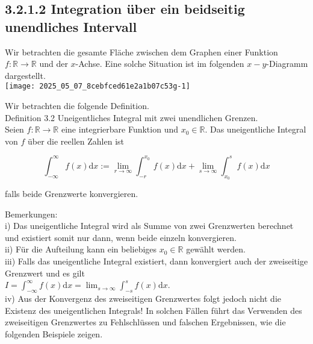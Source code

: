 \documentclass[10pt]{article}
\begin{document}
\subsection*{3.2.1.2 Integration über ein beidseitig unendliches Intervall}
Wir betrachten die gesamte Fläche zwischen dem Graphen einer Funktion $f: \mathbb{R} \rightarrow \mathbb{R}$ und der $x$-Achse. Eine solche Situation ist im folgenden $x-y$-Diagramm dargestellt.\\
\texttt{[image: 2025\_05\_07\_8cebfced61e2a1b07c53g-1]}

Wir betrachten die folgende Definition.\\
Definition 3.2 Uneigentliches Integral mit zwei unendlichen Grenzen.\\
Seien $f: \mathbb{R} \rightarrow \mathbb{R}$ eine integrierbare Funktion und $x_{0} \in \mathbb{R}$. Das uneigentliche Integral von $f$ über die reellen Zahlen ist


\begin{equation*}
\int_{-\infty}^{\infty} f(x) \mathrm{d} x:=\lim _{r \rightarrow \infty} \int_{-r}^{x_{0}} f(x) \mathrm{d} x+\lim _{s \rightarrow \infty} \int_{x_{0}}^{s} f(x) \mathrm{d} x \tag{3.36}
\end{equation*}


falls beide Grenzwerte konvergieren.

Bemerkungen:\\
i) Das uneigentliche Integral wird als Summe von zwei Grenzwerten berechnet und existiert somit nur dann, wenn beide einzeln konvergieren.\\
ii) Für die Aufteilung kann ein beliebiges $x_{0} \in \mathbb{R}$ gewählt werden.\\
iii) Falls das uneigentliche Integral existiert, dann konvergiert auch der zweiseitige Grenzwert und es gilt\\
$I=\int_{-\infty}^{\infty} f(x) \mathrm{d} x=\lim _{s \rightarrow \infty} \int_{-s}^{s} f(x) \mathrm{d} x$.\\
iv) Aus der Konvergenz des zweiseitigen Grenzwertes folgt jedoch nicht die Existenz des uneigentlichen Integrals! In solchen Fällen führt das Verwenden des zweiseitigen Grenzwertes zu Fehlschlüssen und falschen Ergebnissen, wie die folgenden Beispiele zeigen.
\end{document}
